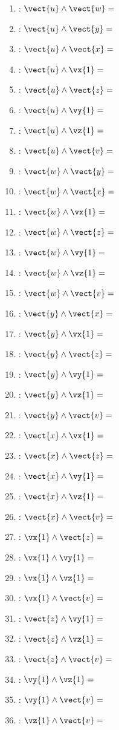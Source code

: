 \else
\begin{multicols}{2}
\begin{enumerate}
\item : $\vect{u}\wedge\vect{w} = $
\item : $\vect{u}\wedge\vect{y} = $
\item : $\vect{u}\wedge\vect{x} = $
\item : $\vect{u}\wedge\vx{1} = $
\item : $\vect{u}\wedge\vect{z} = $
\item : $\vect{u}\wedge\vy{1} = $
\item : $\vect{u}\wedge\vz{1} = $
\item : $\vect{u}\wedge\vect{v} = $
\item : $\vect{w}\wedge\vect{y} = $
\item : $\vect{w}\wedge\vect{x} =  $
\item : $\vect{w}\wedge\vx{1} =  $
\item : $\vect{w}\wedge\vect{z} = $
\item : $\vect{w}\wedge\vy{1} = $
\item : $\vect{w}\wedge\vz{1} = $
\item : $\vect{w}\wedge\vect{v} = $
\item : $\vect{y}\wedge\vect{x} = $
\item : $\vect{y}\wedge\vx{1} = $
\item : $\vect{y}\wedge\vect{z} = $
\item : $\vect{y}\wedge\vy{1} = $
\item : $\vect{y}\wedge\vz{1} = $
\item : $\vect{y}\wedge\vect{v} = $
\item : $\vect{x}\wedge\vx{1} = $
\item : $\vect{x}\wedge\vect{z} = $
\item : $\vect{x}\wedge\vy{1} = $
\item : $\vect{x}\wedge\vz{1} = $
\item : $\vect{x}\wedge\vect{v} = $
\item : $\vx{1}\wedge\vect{z} = $
\item : $\vx{1}\wedge\vy{1} = $
\item : $\vx{1}\wedge\vz{1} = $
\item : $\vx{1}\wedge\vect{v} = $
\item : $\vect{z}\wedge\vy{1} = $
\item : $\vect{z}\wedge\vz{1} = $
\item : $\vect{z}\wedge\vect{v} = $
\item : $\vy{1}\wedge\vz{1} = $
\item : $\vy{1}\wedge\vect{v} = $
\item : $\vz{1}\wedge\vect{v} = $
\end{enumerate}
\end{multicols}
\fi


